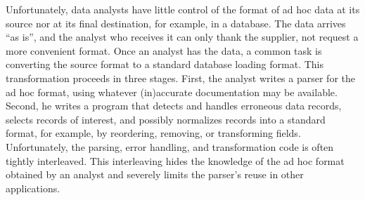 Unfortunately, data analysts have little control of the format of
ad hoc data at its source nor at its final destination, for
example, in a database.  The data arrives ``as is'', and the analyst
who receives it can only thank the supplier, not request a more
convenient format.  Once an analyst has the data, a common task is
converting the source format to a standard database loading format.
This transformation proceeds in three stages.  First, the analyst
writes a parser for the ad hoc format, using whatever (in)accurate
documentation may be available.  Second, he writes a program that 
detects and handles erroneous data records, selects records
of interest, and possibly normalizes records into a standard format,
for example, by reordering, removing, or transforming fields.
Unfortunately, the parsing, error handling, and transformation code is
often tightly interleaved.  This interleaving hides the knowledge of
the ad hoc format obtained by an analyst and severely limits the
parser's reuse in other applications.

